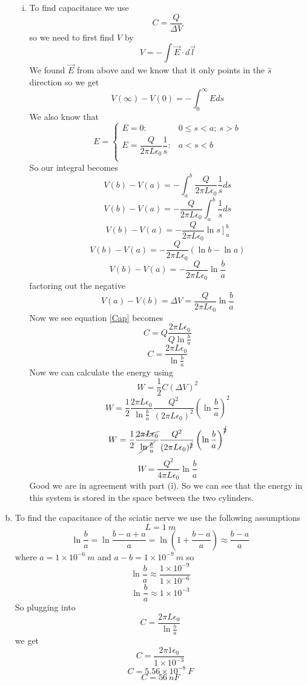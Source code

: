 \documentclass[11pt]{article}
\numberwithin{equation}{section}
\newcommand{\vecE}{\vec{E}}
\begin{document}
\begin{enumerate}[(a)]
\begin{enumerate}[(i)]
\item
To find capacitance we use
\begin{equation}
C = \frac{Q}{\Delta V}
\label{Cap}
\end{equation}
so we need to first find $V$ by
\begin{equation}
V = -\int \vecE\cdot d\vec{l}
\label{PotLin}
\end{equation}
We found $\vecE$ from above and we know that it only points in the $\hat{s}$ direction so we get
$$V(\infty) - V(0) = -\int_0^{\infty} E ds$$
We also know that 
$$E = \left\{     
	\begin{array}{lr}
	E = 0 :& 0\le s<a;\ s>b \\
	E = \dfrac{Q}{2\pi L\epsilon_0}\dfrac{1}{s} :& a<s<b \\
	\end{array}\right.$$
So our integral becomes
$$V(b) - V(a) = -\int_a^{b} \dfrac{Q}{2\pi L\epsilon_0}\frac{1}{s}ds$$
$$V(b) - V(a) = - \dfrac{Q}{2\pi L\epsilon_0}\int_a^{b}\frac{1}{s}ds$$
$$V(b) - V(a) = - \dfrac{Q}{2\pi L\epsilon_0}\left.\ln{s}\right]_a^b$$
$$V(b) - V(a) = - \dfrac{Q}{2\pi L\epsilon_0}\left(\ln{b}-\ln{a}\right)$$
$$V(b) - V(a) = - \dfrac{Q}{2\pi L\epsilon_0}\ln{\frac{b}{a}}$$
factoring out the negative
$$V(a) -V(b) = \Delta V =\dfrac{Q}{2\pi L\epsilon_0}\ln{\frac{b}{a}}$$
Now we see equation \ref{Cap} becomes
$$C =Q\dfrac{2\pi L\epsilon_0}{Q\ln{\frac{b}{a}}}$$
$$C =\dfrac{2\pi L\epsilon_0}{\ln{\frac{b}{a}}}$$
Now we can calculate the energy using
\begin{equation}
W = \frac{1}{2}C(\Delta V)^2
\label{CapEn}
\end{equation}
$$W = \frac{1}{2}\dfrac{2\pi L\epsilon_0}{\ln{\frac{b}{a}}}\dfrac{Q^2}{(2\pi L\epsilon_0)^2}\left(\ln{\frac{b}{a}}\right)^2 $$
$$W = \frac{1}{2}\dfrac{\cancel{2\pi L\epsilon_0}}{\cancel{\ln{\frac{b}{a}}}}\dfrac{Q^2}{(2\pi L\epsilon_0)^{\cancel{2}}}\left(\ln{\frac{b}{a}}\right)^{\cancel{2}} $$
$$W = \dfrac{Q^2}{4\pi L\epsilon_0}\ln{\frac{b}{a}} $$
Good we are in agreement with part (i).
So we can see that the energy in this system is stored in the space between the two cylinders. 
\end{enumerate}
\item
To find the capacitance of the sciatic nerve we use the following assumptions
$$L = 1\ m$$
$$\ln{\frac{b}{a}} = \ln{\frac{b-a+a}{a}} = \ln(1+\frac{b-a}{a}) \approx \frac{b-a}{a}$$
where $a = 1\times10^{-6}\ m$ and $a-b = 1\times10^{-9}\ m$ so 
$$\ln{\frac{b}{a}} \approx \frac{1\times10^{-9}}{1\times10^{-6}}$$
$$\ln{\frac{b}{a}} \approx 1\times10^{-3}$$
So plugging into 
$$C =\dfrac{2\pi L\epsilon_0}{\ln{\frac{b}{a}}}$$
we get
$$C =\dfrac{2\pi 1\epsilon_0}{1\times10^{-3}}$$
$$C = 5.56\times10^{-8}\ F$$
$$C = 56\ nF$$
\end{enumerate}
\end{document}
